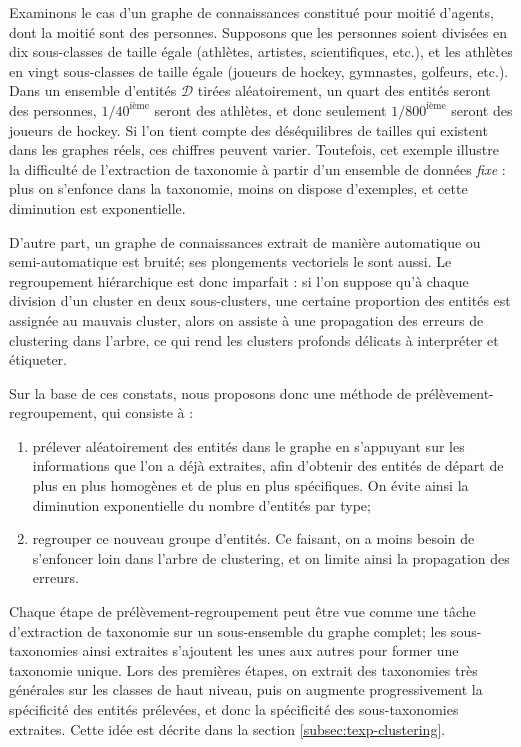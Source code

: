 Examinons le cas d'un graphe de connaissances constitué pour moitié d'agents, dont la moitié sont des personnes. Supposons que les personnes soient divisées en dix sous-classes de taille égale (athlètes, artistes, scientifiques, etc.), et les athlètes en vingt sous-classes de taille égale (joueurs de hockey, gymnastes, golfeurs, etc.). Dans un ensemble d'entités $\mathcal{D}$ tirées aléatoirement, un quart des entités seront des personnes, $1/40^\textrm{ième}$ seront des athlètes, et donc seulement $1/800^\textrm{ième}$ seront des joueurs de hockey. Si l'on tient compte des déséquilibres de tailles qui existent dans les graphes réels, ces chiffres peuvent varier. Toutefois, cet exemple illustre la difficulté de l'extraction de taxonomie à partir d'un ensemble de données \textit{fixe} : plus on s'enfonce dans la taxonomie, moins on dispose d'exemples, et cette diminution est exponentielle.

D'autre part, un graphe de connaissances extrait de manière automatique ou semi-automatique est bruité; ses plongements vectoriels le sont aussi. Le regroupement hiérarchique est donc imparfait : si l'on suppose qu'à chaque division d'un cluster en deux sous-clusters, une certaine proportion des entités est assignée au mauvais cluster, alors on assiste à une propagation des erreurs de clustering dans l'arbre, ce qui rend les clusters profonds délicats à interpréter et étiqueter. 

Sur la base de ces constats, nous proposons donc une méthode de prélèvement-regroupement, qui consiste à :
\renewcommand{\theenumi}{\alph{enumi}}
\begin{enumerate}
    \item prélever aléatoirement des entités dans le graphe en s'appuyant sur les informations que l'on a déjà extraites, afin d'obtenir des entités de départ de plus en plus homogènes et de plus en plus spécifiques. On évite ainsi la diminution exponentielle du nombre d'entités par type;
    \item regrouper ce nouveau groupe d'entités. Ce faisant, on a moins besoin de s'enfoncer loin dans l'arbre de clustering, et on  limite ainsi la propagation des erreurs.
\end{enumerate}

Chaque étape de prélèvement-regroupement peut être vue comme une tâche d'extraction de taxonomie sur un sous-ensemble du graphe complet; les sous-taxonomies ainsi extraites s'ajoutent les unes aux autres pour former une taxonomie unique. Lors des premières étapes, on extrait des taxonomies très générales sur les classes de haut niveau, puis on augmente progressivement la spécificité des entités prélevées, et donc la spécificité des sous-taxonomies extraites. Cette idée est décrite dans la section \ref{subsec:texp-clustering}.

